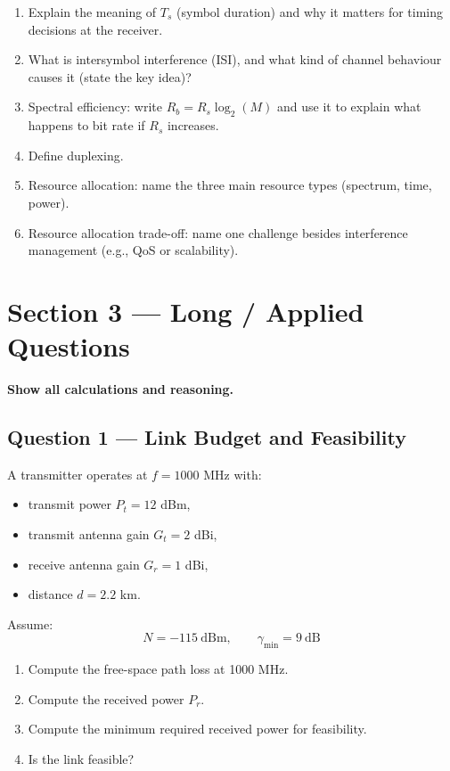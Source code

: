 \documentclass[11pt,a4paper]{article}
\begin{document}
\begin{enumerate}[leftmargin=0.9cm]
\item Explain the meaning of $T_s$ (symbol duration) and why it matters for timing decisions at the receiver.

\item What is intersymbol interference (ISI), and what kind of channel behaviour causes it (state the key idea)?

\item Spectral efficiency: write $R_b = R_s\log_2(M)$ and use it to explain what happens to bit rate if $R_s$ increases.

\item Define duplexing.

\item Resource allocation: name the three main resource types (spectrum, time, power).

\item Resource allocation trade-off: name one challenge besides interference management (e.g., QoS or scalability).
\end{enumerate}

\newpage
\section*{Section 3 --- Long / Applied Questions}
\textbf{Show all calculations and reasoning.}

\subsection*{Question 1 --- Link Budget and Feasibility}
A transmitter operates at $f = 1000$ MHz with:
\begin{itemize}[leftmargin=1.2cm]
    \item transmit power $P_t = 12$ dBm,
    \item transmit antenna gain $G_t = 2$ dBi,
    \item receive antenna gain $G_r = 1$ dBi,
    \item distance $d = 2.2$ km.
\end{itemize}

Assume:
\[
N = -115\ \mathrm{dBm}, \qquad \gamma_{\min} = 9\ \mathrm{dB}
\]

\begin{enumerate}[label=\alph*)]
    \item Compute the free-space path loss at 1000 MHz.
    \item Compute the received power $P_r$.
    \item Compute the minimum required received power for feasibility.
    \item Is the link feasible?
\end{enumerate}
\end{document}
